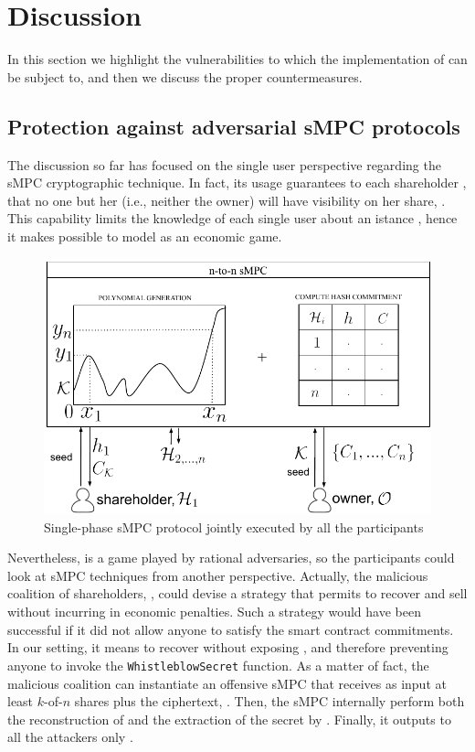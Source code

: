 \section{Discussion}\label{sect:impl_attacks}

In this section we highlight the vulnerabilities to which the implementation of \shortname can be subject to, and then we discuss the proper countermeasures.  

\subsection{Protection against adversarial sMPC protocols}\label{sect:impl_mpc}

The discussion so far has focused on the single user perspective regarding the sMPC cryptographic technique.
In fact, its usage guarantees to each shareholder \shareholder, that no one but her (i.e., neither the owner) will have visibility on her share, \share.
This capability limits the knowledge of each single user about an istance \shortname, hence it makes possible to model \shortname as an economic game. 

\begin{figure}[t]
	\centering
	\includegraphics[width=0.8\columnwidth]{fig/mpc_rev_1.pdf}
	\caption{Single-phase sMPC protocol jointly executed by all the participants}
	\label{fig:mpc1}
\end{figure}

Nevertheless, \shortname is a game played by rational adversaries, so the participants could look at sMPC techniques from another perspective.
Actually, the malicious coalition of shareholders, \coalition, could devise a strategy that permits to recover and sell \secret without incurring in economic penalties. 
Such a strategy would have been successful if it did not allow anyone to satisfy the smart contract commitments.
In our setting, it means to recover \secret without exposing \key, and therefore preventing anyone to invoke the \texttt{WhistleblowSecret} function.
As a matter of fact, the malicious coalition can instantiate an offensive sMPC that receives as input at least $k$-of-$n$ shares plus the ciphertext, \ciphertext.
Then, the sMPC internally perform both the reconstruction of \key and the extraction of the secret by \unwrap.
Finally, it outputs to all the attackers only \secret. 

